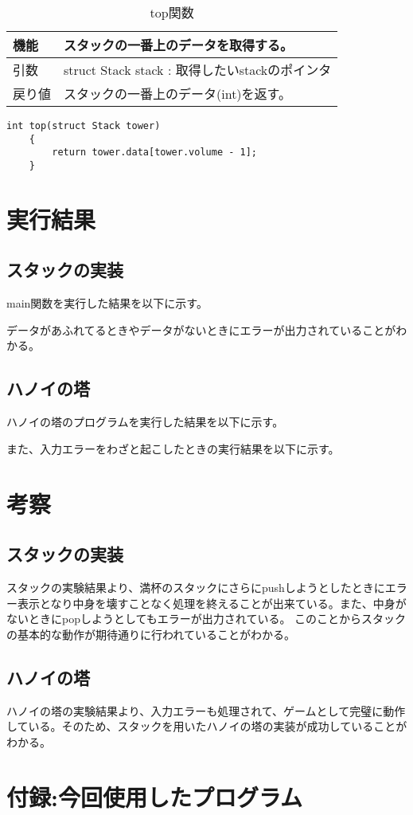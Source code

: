 \documentclass[dvipdfmx]{jsarticle}
\begin{document}
\begin{table}[ht]
  \centering
  \begin{tabular}{|p{5cm}|p{10cm}|}
    \hline
    機能  & スタックの一番上のデータを取得する。                         \\
    \hline
    引数  & struct Stack stack : 取得したいstackのポインタ \\
    \hline
    戻り値 & スタックの一番上のデータ(int)を返す。                   \\
  \end{tabular}
  \begin{lstlisting}[frame=single]
    int top(struct Stack tower)
    {
        return tower.data[tower.volume - 1];
    }
  \end{lstlisting}
  \caption{top関数}
  \label{tab:top_func}
\end{table}
\clearpage
\section{実行結果}
\subsection{スタックの実装}
main関数を実行した結果を以下に示す。

データがあふれてるときやデータがないときにエラーが出力されていることがわかる。
\subsection{ハノイの塔}
ハノイの塔のプログラムを実行した結果を以下に示す。

\newpage
また、入力エラーをわざと起こしたときの実行結果を以下に示す。\\


\section{考察}
\subsection{スタックの実装}
スタックの実験結果より、満杯のスタックにさらにpushしようとしたときにエラー表示となり中身を壊すことなく処理を終えることが出来ている。また、中身がないときにpopしようとしてもエラーが出力されている。
このことからスタックの基本的な動作が期待通りに行われていることがわかる。
\subsection{ハノイの塔}
ハノイの塔の実験結果より、入力エラーも処理されて、ゲームとして完璧に動作している。そのため、スタックを用いたハノイの塔の実装が成功していることがわかる。

\section{付録:今回使用したプログラム}


\end{document}
